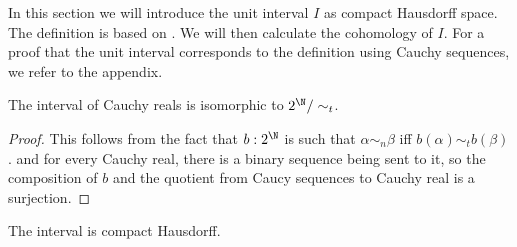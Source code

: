 In this section we will introduce the unit interval $I$ as compact Hausdorff space. 
The definition is based on \cite{Bishop}. 
We will then calculate the cohomology of $I$. 
For a proof that the unit interval corresponds to the definition using Cauchy sequences, 
we refer to the appendix. 











\begin{theorem}
  The interval of Cauchy reals is isomorphic to $2^\N / \sim_t$. 
\end{theorem} 
\begin{proof}
  This follows from the fact that $b:2^\N$ is such that $\alpha\sim_n \beta$ iff $b(\alpha)\sim_t b(\beta)$. 
  and for every Cauchy real, there is a binary sequence being sent to it, so the composition of $b$ and the 
  quotient from Caucy sequences to Cauchy real is a surjection. 
\end{proof}

\begin{corollary}
  The interval is compact Hausdorff. 
\end{corollary}
